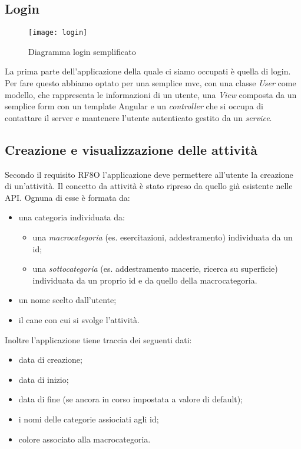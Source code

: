\subsection{Login}

\begin{wrapfigure}{l}{0.5\textwidth}
  \texttt{[image: login]} 
  \caption{Diagramma login semplificato}
  \label{fig:login}
\end{wrapfigure}

La prima parte dell'applicazione della quale ci siamo occupati è quella di login. Per fare questo abbiamo optato per una semplice \acrlong{mvc}, con
una classe \textit{User} come modello, che rappresenta le informazioni di un utente, una \textit{View} composta da un semplice form con un
template Angular e un \textit{controller} che si occupa di contattare il server e mantenere l'utente autenticato gestito da un
\textit{service}. \\

\subsection{Creazione e visualizzazione delle attività}
Secondo il requisito RF8O l'applicazione deve permettere all'utente la creazione di un'attività. Il concetto da attività è stato ripreso da
quello già esistente nelle API. Ognuna di esse è formata da:
\begin{itemize}
  \item una categoria individuata da: 
  \begin{itemize}
    \item una \textit{macrocategoria} (es. esercitazioni, addestramento) individuata da un id;
    \item una \textit{sottocategoria} (es. addestramento macerie, ricerca su superficie) individuata da un proprio id e da quello della macrocategoria.
  \end{itemize}
  \item un nome scelto dall'utente;
  \item il cane con cui si svolge l'attività.
\end{itemize}
Inoltre l'applicazione tiene traccia dei seguenti dati:
\begin{itemize}
  \item data di creazione;
  \item data di inizio;
  \item data di fine (se ancora in corso impostata a valore di default);
  \item i nomi delle categorie assiociati agli id;
  \item colore associato alla macrocategoria.
\end{itemize}

